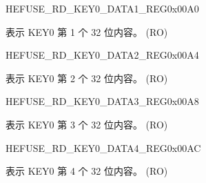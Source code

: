 \begin{register}{H}{EFUSE\_RD\_KEY0\_DATA1\_REG}{0x{}00A0}\label{regdesc:EFUSERDKEY0DATA1REG}
%
\regnewline%
\begin{regdesc}\begin{reglist}
\label{fielddesc:EFUSEKEY0DATA1}\item [EFUSE\_KEY0\_DATA1] 表示 KEY0 第 1 个 32 位内容。 (RO)
\end{reglist}\end{regdesc}
\end{register}


\begin{register}{H}{EFUSE\_RD\_KEY0\_DATA2\_REG}{0x{}00A4}\label{regdesc:EFUSERDKEY0DATA2REG}
%
\regnewline%
\begin{regdesc}\begin{reglist}
\label{fielddesc:EFUSEKEY0DATA2}\item [EFUSE\_KEY0\_DATA2] 表示 KEY0 第 2 个 32 位内容。 (RO)
\end{reglist}\end{regdesc}
\end{register}


\begin{register}{H}{EFUSE\_RD\_KEY0\_DATA3\_REG}{0x{}00A8}\label{regdesc:EFUSERDKEY0DATA3REG}
%
\regnewline%
\begin{regdesc}\begin{reglist}
\label{fielddesc:EFUSEKEY0DATA3}\item [EFUSE\_KEY0\_DATA3] 表示 KEY0 第 3 个 32 位内容。 (RO)
\end{reglist}\end{regdesc}
\end{register}


\begin{register}{H}{EFUSE\_RD\_KEY0\_DATA4\_REG}{0x{}00AC}\label{regdesc:EFUSERDKEY0DATA4REG}
%
\regnewline%
\begin{regdesc}\begin{reglist}
\label{fielddesc:EFUSEKEY0DATA4}\item [EFUSE\_KEY0\_DATA4] 表示 KEY0 第 4 个 32 位内容。 (RO)
\end{reglist}\end{regdesc}
\end{register}


